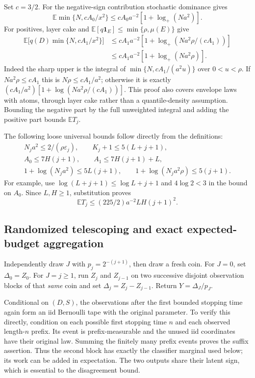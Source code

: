 Set $c=3/2$. For the negative-sign contribution stochastic dominance gives
\[
 \mathbb E\min\{N,cA_0/x^2\}
 \le cA_0a^{-2}[1+\log_+(Na^2)].
\]
For positives, layer cake and
$\mathbb E[q\mathbf1_E]\le\min\{\rho,\mu(E)\}$ give
\begin{align*}
 \mathbb E\bigl[q(D)\min\{N,cA_1/x^2\}\bigr]
 &\le cA_1a^{-2}[1+\log_+(Na^2\rho/(cA_1))]\\
 &\le cA_1a^{-2}[1+\log_+(Na^2\rho)].
\end{align*}
Indeed the sharp upper is the integral of
$\min\{N,cA_1/(a^2u)\}$ over $0<u<\rho$. If
$Na^2\rho\le cA_1$ this is $N\rho\le cA_1/a^2$; otherwise it is exactly
$(cA_1/a^2)[1+\log(Na^2\rho/(cA_1))]$. This proof also covers envelope laws
with atoms, through layer cake rather than a quantile-density assumption.
Bounding the negative part by the full unweighted integral and adding the
positive part bounds $\mathbb ET_j$.

The following loose universal bounds follow directly from the definitions:
\[
 \begin{gathered}
 N_ja^2\le2/(\rho\varepsilon_j),\qquad K_j+1\le5(L+j+1),\\
 A_0\le7H(j+1),\qquad A_1\le7H(j+1)+L,\\
 1+\log(N_ja^2)\le5L(j+1),\qquad
 1+\log(N_ja^2\rho)\le5(j+1).
 \end{gathered}
\]
For example, use $\log(L+j+1)\le\log L+j+1$ and $4\log2<3$ in the
bound on $A_0$. Since $L,H\ge1$, substitution proves
\begin{equation}\label{crit:work}
 \mathbb ET_j\le(225/2)a^{-2}LH(j+1)^2.
\end{equation}

\subsection{Randomized telescoping and exact expected-budget aggregation}
Independently draw $J$ with $p_j=2^{-(j+1)}$, then draw a fresh coin. For
$J=0$, set $\Delta_0=Z_0$. For $J=j\ge1$, run $Z_j$ and $Z_{j-1}$ on
two successive disjoint observation blocks of that \emph{same} coin and set
$\Delta_j=Z_j-Z_{j-1}$. Return $Y=\Delta_J/p_J$.

Conditional on $(D,S)$, the observations after the first bounded stopping
time again form an iid Bernoulli tape with the original parameter. To verify
this directly, condition on each possible first stopping time $n$ and each
observed length-$n$ prefix. Its event is prefix-measurable and the unused iid
coordinates have their original law. Summing the finitely many prefix events
proves the suffix assertion. Thus the second block has exactly the classifier
marginal used below; its work can be added in expectation. The two outputs
share their latent sign, which is essential to the disagreement bound.

